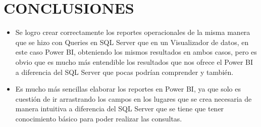 \documentclass[12pt,letterpaper]{article}
\begin{document}
    \newpage
    \section{CONCLUSIONES}
    \begin{itemize}
        \item Se logro crear correctamente los reportes operacionales de la misma manera que se hizo con Queries en SQL Server que en un Visualizador de datos, en este caso Power BI, obteniendo los mismos resultados en ambos casos, pero es obvio que es mucho más entendible los resultados que nos ofrece el Power BI a diferencia del SQL Server que pocas podrían comprender y también.
        \item Es mucho más sencillas elaborar los reportes en Power BI, ya que solo es cuestión de ir arrastrando los campos en los lugares que se crea necesaria de manera intuitiva a diferencia del SQL Server que se tiene que tener conocimiento básico para poder realizar las consultas.
    \end{itemize}
    \newpage
\end{document}
